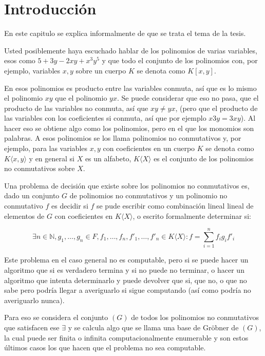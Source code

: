 \documentclass{report}
\theoremstyle{customstyle}
\theoremstyle{factstyle}
\begin{document}
\fontsize{16pt}{19pt}\selectfont %

\chapter{Introducción}

En este capitulo se explica informalmente de que se trata el tema de la tesis.

Usted posiblemente haya escuchado hablar de los polinomios de varias variables, esos como $5  + 3 y - 2 x y + x^3 y^5$ y que todo el conjunto de los polinomios con, por ejemplo, variables $x, y$ sobre un cuerpo $K$ se denota como $K[x, y]$.

En esos polinomios es producto entre las variables conmuta, así que es lo mismo el polinomio $x y$ que el polinomio $y x$. Se puede considerar que eso no pasa, que el producto de las variables no conmuta, así que $x y ≠ y x$, (pero que el producto de las variables con los coeficientes si conmuta, así que por ejemplo $x 3 y = 3 x y$). Al hacer eso se obtiene algo como los polinomios, pero en el que los monomios son palabras. A esos polinomios se los llama polinomios no conmutativos y, por ejemplo, para las variables $x, y$ con coeficientes en un cuerpo $K$ se denota como $K⟨x, y⟩$ y en general si $X$ es un alfabeto, $K⟨X⟩$ es el conjunto de los polinomios no conmutativos sobre $X$.

Una problema de decisión que existe sobre los polinomios no conmutativos es, dado un conjunto $G$ de polinomios no conmutativos y un polinomio no conmutativo $f$ es decidir si $f$ se pude escribir como combinación lineal lineal de elementos de $G$ con coeficientes en $K⟨X⟩$, o escrito formalmente determinar si:

\[ ∃n ∈ ℕ, g_1, …, g_n ∈ F, f_1, …, f_n, f'_1, …, f'_n ∈ K⟨X⟩ : f = ∑_{i = 1}^n f_i g_i f'_i \]

Este problema en el caso general no es computable, pero si se puede hacer un algoritmo que si es verdadero termina y si no puede no terminar, o hacer un algoritmo que intenta determinarlo y puede devolver que si, que no, o que no sabe pero podría llegar a averiguarlo si sigue computando (así como podría no averiguarlo nunca).

Para eso se considera el conjunto $(G)$ de todos los polinomios no conmutativos que satisfacen ese $∃$ y se calcula algo que se llama una base de Gröbner de $(G)$, la cual puede ser finita o infinita computacionalmente enumerable y son estos últimos casos los que hacen que el problema no sea computable.
\end{document}
